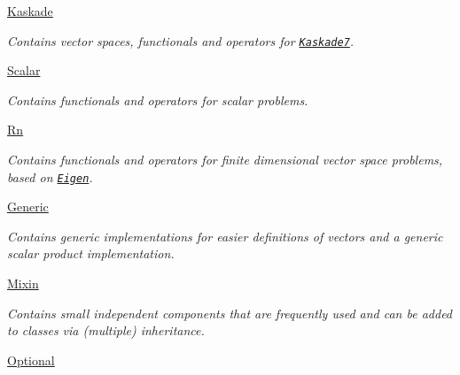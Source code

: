 \begin{DoxyCompactItemize}
\hyperlink{namespaceSpacy_1_1Kaskade}{Kaskade}
\begin{DoxyCompactList}\small\item\em Contains vector spaces, functionals and operators for \href{http://www.zib.de/projects/kaskade7-finite-element-toolbox}{\tt Kaskade7}. \end{DoxyCompactList}\item 
\hyperlink{namespaceSpacy_1_1Scalar}{Scalar}
\begin{DoxyCompactList}\small\item\em Contains functionals and operators for scalar problems. \end{DoxyCompactList}\item 
\hyperlink{namespaceSpacy_1_1Rn}{Rn}
\begin{DoxyCompactList}\small\item\em Contains functionals and operators for finite dimensional vector space problems, based on \href{http://eigen.tuxfamily.org}{\tt Eigen}. \end{DoxyCompactList}\item 
\hyperlink{namespaceSpacy_1_1Generic}{Generic}
\begin{DoxyCompactList}\small\item\em Contains generic implementations for easier definitions of vectors and a generic scalar product implementation. \end{DoxyCompactList}\item 
\hyperlink{namespaceSpacy_1_1Mixin}{Mixin}
\begin{DoxyCompactList}\small\item\em Contains small independent components that are frequently used and can be added to classes via (multiple) inheritance. \end{DoxyCompactList}\item 
\hyperlink{namespaceSpacy_1_1Optional}{Optional}
\end{DoxyCompactItemize}
